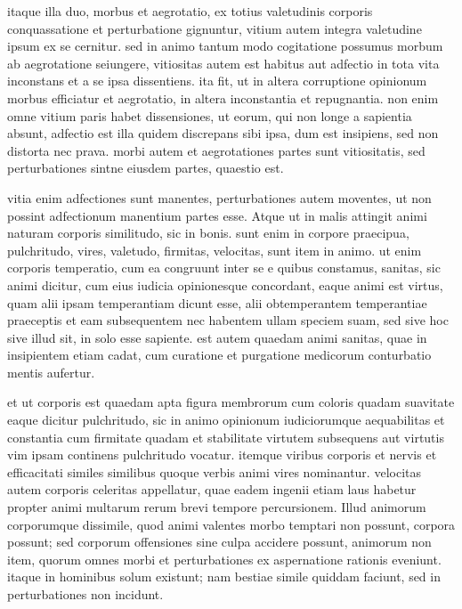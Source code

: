  itaque illa duo, morbus et aegrotatio, ex totius valetudinis corporis conquassatione et perturbatione gignuntur, vitium autem integra valetudine ipsum ex se cernitur. sed in animo tantum modo cogitatione possumus morbum ab aegrotatione seiungere, vitiositas autem est habitus aut adfectio in tota vita inconstans et a se ipsa dissentiens. ita fit, ut in altera corruptione opinionum morbus efficiatur et aegrotatio, in altera inconstantia et repugnantia. non enim omne vitium paris habet dissensiones, ut eorum, qui non longe a sapientia absunt, adfectio est illa quidem discrepans sibi ipsa, dum est insipiens, sed non distorta nec prava. morbi autem et aegrotationes partes sunt vitiositatis, sed perturbationes sintne eiusdem partes, quaestio est.

 vitia enim adfectiones sunt manentes, perturbationes autem moventes, ut non possint adfectionum manentium partes esse. Atque ut in malis attingit animi naturam corporis similitudo, sic in bonis. sunt enim in corpore praecipua, pulchritudo, vires, valetudo, firmitas, velocitas, sunt item in animo. ut enim corporis temperatio, cum ea congruunt inter se e quibus constamus, sanitas, sic animi dicitur, cum eius iudicia opinionesque concordant, eaque animi est virtus, quam alii ipsam temperantiam dicunt esse, alii obtemperantem temperantiae praeceptis et eam subsequentem nec habentem ullam speciem suam, sed sive hoc sive illud sit, in solo esse sapiente. est autem quaedam animi sanitas, quae in insipientem etiam cadat, cum curatione et purgatione medicorum conturbatio mentis aufertur.

 et ut corporis est quaedam apta figura membrorum cum coloris quadam suavitate eaque dicitur pulchritudo, sic in animo opinionum iudiciorumque aequabilitas et constantia cum firmitate quadam et stabilitate virtutem subsequens aut virtutis vim ipsam continens pulchritudo vocatur. itemque viribus corporis et nervis et efficacitati similes similibus quoque verbis animi vires nominantur. velocitas autem corporis celeritas appellatur, quae eadem ingenii etiam laus habetur propter animi multarum rerum brevi tempore percursionem. Illud animorum corporumque dissimile, quod animi valentes morbo temptari non possunt, corpora possunt; sed corporum offensiones sine culpa accidere possunt, animorum non item, quorum omnes morbi et perturbationes ex aspernatione rationis eveniunt. itaque in hominibus solum existunt; nam bestiae simile quiddam faciunt, sed in perturbationes non incidunt.

